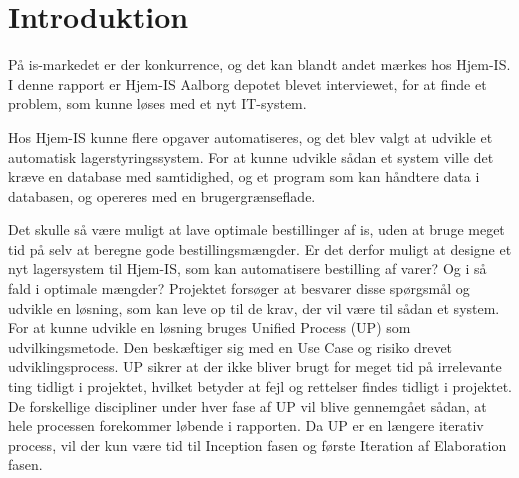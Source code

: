 \chapter{Introduktion}\label{ch:introduction}
På is-markedet er der konkurrence, og det kan blandt andet mærkes hos Hjem-IS. I denne rapport er Hjem-IS Aalborg depotet blevet interviewet, for at finde et problem, som kunne løses med et nyt IT-system.  

Hos Hjem-IS kunne flere opgaver automatiseres, og det blev valgt at udvikle et automatisk lagerstyringssystem. For at kunne udvikle sådan et system ville det kræve en database med samtidighed, og et program som kan håndtere data i databasen, og opereres med en brugergrænseflade. 

Det skulle så være muligt at lave optimale bestillinger af is, uden at bruge meget tid på selv at beregne gode bestillingsmængder. Er det derfor muligt at designe et nyt lagersystem til Hjem-IS, som kan automatisere bestilling af varer? Og i så fald i optimale mængder? 
Projektet forsøger at besvarer disse spørgsmål og udvikle en løsning, som kan leve op til de krav, der vil være til sådan et system. For at kunne udvikle en løsning bruges Unified Process (UP)\cite{UnifiedProcess} som udvilkingsmetode. Den beskæftiger sig med en Use Case og risiko drevet udviklingsprocess. UP sikrer at der ikke bliver brugt for meget tid på irrelevante ting tidligt i projektet, hvilket betyder at fejl og rettelser findes tidligt i projektet. De forskellige discipliner under hver fase af UP vil blive gennemgået sådan, at hele processen forekommer løbende i rapporten. Da UP er en længere iterativ process, vil der kun være tid til Inception fasen og første Iteration af Elaboration fasen\cite{UnifiedProcess}.